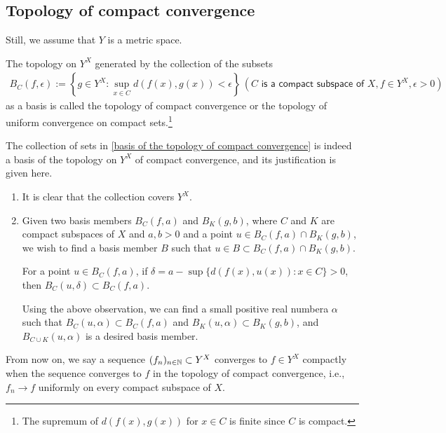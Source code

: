 \subsection{Topology of compact convergence}
Still, we assume that $Y$ is a metric space.
\begin{defi}
    The topology on $Y^X$ generated by the collection of the subsets
    \begin{align}\label{basis of the topology of compact convergence}
        B_C(f, \epsilon):=\left\{g\in Y^X: \sup_{x\in C} d(f(x), g(x))<\epsilon\right\}\,(C\textsf{ is a compact subspace of }X, f\in Y^X, \epsilon>0)
    \end{align}
    as a basis is called the topology of compact convergence or the topology of uniform convergence on compact sets.\footnote{The supremum of $d(f(x), g(x))$ for $x\in C$ is finite since $C$ is compact.}
\end{defi}
\begin{rmk}
    The collection of sets in \cref{basis of the topology of compact convergence} is indeed a basis of the topology on $Y^X$ of compact convergence, and its justification is given here.
    \begin{enumerate}
        \item[(1)]
        {
            It is clear that the collection covers $Y^X$.
        }
        \item[(2)]
        {
            Given two basis members $B_C(f, a)$ and $B_K(g, b)$, where $C$ and $K$ are compact subspaces of $X$ and $a, b>0$ and a point $u\in B_C(f, a)\cap B_K(g, b)$, we wish to find a basis member $B$ such that $u\in B\subset B_C(f, a)\cap B_K(g, b)$.
            \begin{center}
                For a point $u\in B_C(f, a)$, if $\delta=a-\sup\{d(f(x), u(x)): x\in C\}>0$, then $B_C(u, \delta)\subset B_C(f, a)$.
            \end{center}
            Using the above observation, we can find a small positive real numbera $\alpha$ such that $B_C(u, \alpha)\subset B_C(f, a)$ and $B_K(u, \alpha)\subset B_K(g, b)$, and $B_{C\cup K}(u, \alpha)$ is a desired basis member.
        }
    \end{enumerate}
\end{rmk}
From now on, we say a sequence $(f_n)_{n\in{\mathbb{N}}}\subset Y^X$ converges to $f\in Y^X$ compactly when the sequence converges to $f$ in the topology of compact convergence, i.e., $f_n\rightarrow f$ uniformly on every compact subspace of $X$.

